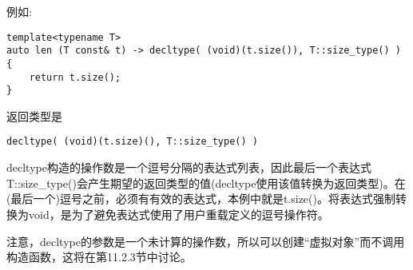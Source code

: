 例如:

\begin{lstlisting}[style=styleCXX]
template<typename T>
auto len (T const& t) -> decltype( (void)(t.size()), T::size_type() )
{
	return t.size();
}
\end{lstlisting}

返回类型是

\begin{lstlisting}[style=styleCXX]
decltype( (void)(t.size)(), T::size_type() )
\end{lstlisting}

decltype构造的操作数是一个逗号分隔的表达式列表，因此最后一个表达式T::size\_type()会产生期望的返回类型的值(decltype使用该值转换为返回类型)。在(最后一个)逗号之前，必须有有效的表达式，本例中就是t.size()。将表达式强制转换为void，是为了避免表达式使用了用户重载定义的逗号操作符。

注意，decltype的参数是一个未计算的操作数，所以可以创建“虚拟对象”而不调用构造函数，这将在第11.2.3节中讨论。























